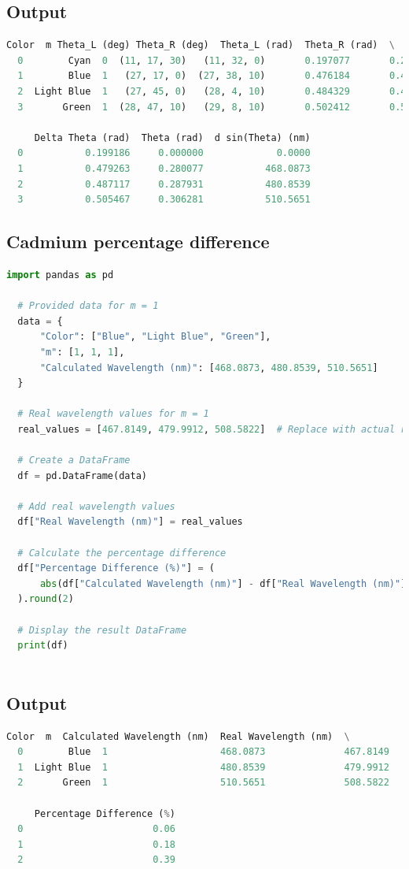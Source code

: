 \documentclass[a4paper,11pt]{article}
\begin{document}
\subsection*{Output}
\begin{lstlisting}[language=Python]
  Color  m Theta_L (deg) Theta_R (deg)  Theta_L (rad)  Theta_R (rad)  \
  0        Cyan  0  (11, 17, 30)   (11, 32, 0)       0.197077       0.201295   
  1        Blue  1   (27, 17, 0)  (27, 38, 10)       0.476184       0.482341   
  2  Light Blue  1   (27, 45, 0)   (28, 4, 10)       0.484329       0.489904   
  3       Green  1  (28, 47, 10)   (29, 8, 10)       0.502412       0.508521   
  
     Delta Theta (rad)  Theta (rad)  d sin(Theta) (nm)  
  0           0.199186     0.000000             0.0000  
  1           0.479263     0.280077           468.0873  
  2           0.487117     0.287931           480.8539  
  3           0.505467     0.306281           510.5651
\end{lstlisting}

\newpage
%
\subsection*{Cadmium percentage difference}
\begin{lstlisting}[language=Python]
  import pandas as pd

  # Provided data for m = 1
  data = {
      "Color": ["Blue", "Light Blue", "Green"],
      "m": [1, 1, 1],
      "Calculated Wavelength (nm)": [468.0873, 480.8539, 510.5651]
  }
  
  # Real wavelength values for m = 1
  real_values = [467.8149, 479.9912, 508.5822]  # Replace with actual real values
  
  # Create a DataFrame
  df = pd.DataFrame(data)
  
  # Add real wavelength values
  df["Real Wavelength (nm)"] = real_values
  
  # Calculate the percentage difference
  df["Percentage Difference (%)"] = (
      abs(df["Calculated Wavelength (nm)"] - df["Real Wavelength (nm)"]) / df["Real Wavelength (nm)"] * 100
  ).round(2)
  
  # Display the result DataFrame
  print(df)
  
\end{lstlisting}
\subsection*{Output}
\begin{lstlisting}[language=Python]
  Color  m  Calculated Wavelength (nm)  Real Wavelength (nm)  \
  0        Blue  1                    468.0873              467.8149   
  1  Light Blue  1                    480.8539              479.9912   
  2       Green  1                    510.5651              508.5822   
  
     Percentage Difference (%)  
  0                       0.06  
  1                       0.18  
  2                       0.39
\end{lstlisting}
\end{document}
